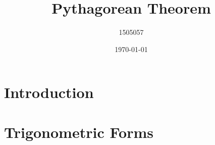 \documentclass{article}
\title{Pythagorean Theorem}
\author{1505057}
\date{\today}
\begin{document}
\maketitle

\section{Introduction}


\section{Trigonometric Forms}

\end{document}
